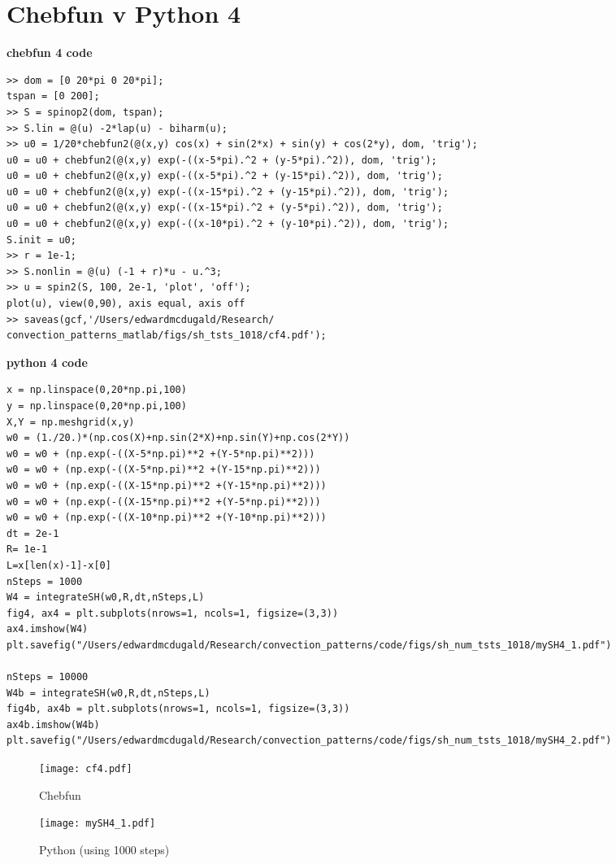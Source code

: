 \documentclass[12pt]{article}
\begin{document}
\section{Chebfun v Python 4}
\textbf{chebfun 4 code}
\begin{verbatim}
>> dom = [0 20*pi 0 20*pi];
tspan = [0 200];
>> S = spinop2(dom, tspan);
>> S.lin = @(u) -2*lap(u) - biharm(u);
>> u0 = 1/20*chebfun2(@(x,y) cos(x) + sin(2*x) + sin(y) + cos(2*y), dom, 'trig');
u0 = u0 + chebfun2(@(x,y) exp(-((x-5*pi).^2 + (y-5*pi).^2)), dom, 'trig');
u0 = u0 + chebfun2(@(x,y) exp(-((x-5*pi).^2 + (y-15*pi).^2)), dom, 'trig');
u0 = u0 + chebfun2(@(x,y) exp(-((x-15*pi).^2 + (y-15*pi).^2)), dom, 'trig');
u0 = u0 + chebfun2(@(x,y) exp(-((x-15*pi).^2 + (y-5*pi).^2)), dom, 'trig');
u0 = u0 + chebfun2(@(x,y) exp(-((x-10*pi).^2 + (y-10*pi).^2)), dom, 'trig');
S.init = u0;
>> r = 1e-1;
>> S.nonlin = @(u) (-1 + r)*u - u.^3;
>> u = spin2(S, 100, 2e-1, 'plot', 'off');
plot(u), view(0,90), axis equal, axis off
>> saveas(gcf,'/Users/edwardmcdugald/Research/
convection_patterns_matlab/figs/sh_tsts_1018/cf4.pdf');
\end{verbatim}

\textbf{python 4 code}
\begin{verbatim}
x = np.linspace(0,20*np.pi,100)
y = np.linspace(0,20*np.pi,100)
X,Y = np.meshgrid(x,y)
w0 = (1./20.)*(np.cos(X)+np.sin(2*X)+np.sin(Y)+np.cos(2*Y))
w0 = w0 + (np.exp(-((X-5*np.pi)**2 +(Y-5*np.pi)**2)))
w0 = w0 + (np.exp(-((X-5*np.pi)**2 +(Y-15*np.pi)**2)))
w0 = w0 + (np.exp(-((X-15*np.pi)**2 +(Y-15*np.pi)**2)))
w0 = w0 + (np.exp(-((X-15*np.pi)**2 +(Y-5*np.pi)**2)))
w0 = w0 + (np.exp(-((X-10*np.pi)**2 +(Y-10*np.pi)**2)))
dt = 2e-1
R= 1e-1
L=x[len(x)-1]-x[0]
nSteps = 1000
W4 = integrateSH(w0,R,dt,nSteps,L)
fig4, ax4 = plt.subplots(nrows=1, ncols=1, figsize=(3,3))
ax4.imshow(W4)
plt.savefig("/Users/edwardmcdugald/Research/convection_patterns/code/figs/sh_num_tsts_1018/mySH4_1.pdf")

nSteps = 10000
W4b = integrateSH(w0,R,dt,nSteps,L)
fig4b, ax4b = plt.subplots(nrows=1, ncols=1, figsize=(3,3))
ax4b.imshow(W4b)
plt.savefig("/Users/edwardmcdugald/Research/convection_patterns/code/figs/sh_num_tsts_1018/mySH4_2.pdf")
\end{verbatim}
\begin{figure}
\centering
\parbox{7cm}{
\texttt{[image: cf4.pdf]}
\caption{Chebfun}
\label{fig:2figsA}}
\qquad
\begin{minipage}{7cm}
\texttt{[image: mySH4\_1.pdf]}
\caption{Python (using 1000 steps)}
\label{fig:2figsB}
\end{minipage}
\end{figure}
\end{document}
